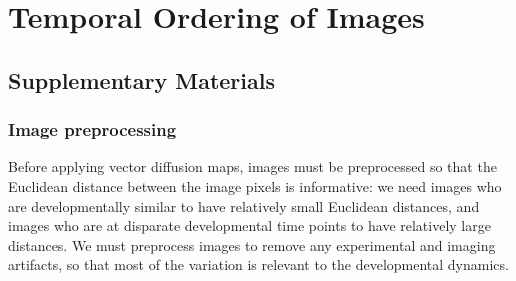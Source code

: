 \chapter{Temporal Ordering of Images \label{app:drosophila}}

\graphicspath{{ch-drosophila/figures/}}

\section{Supplementary Materials}

\subsection{Image preprocessing}

Before applying vector diffusion maps, images must be preprocessed so that the Euclidean distance between the image pixels is informative: we need images who are developmentally similar to have relatively small Euclidean distances, and images who are at disparate developmental time points to have relatively large distances. 
%
We must preprocess images to remove any experimental and imaging artifacts, so that most of the variation is relevant to the developmental dynamics. 

